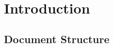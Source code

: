 \chapter{Introduction}\label{ch:introduction}


\section{Document Structure}\label{sec:document_structure}
